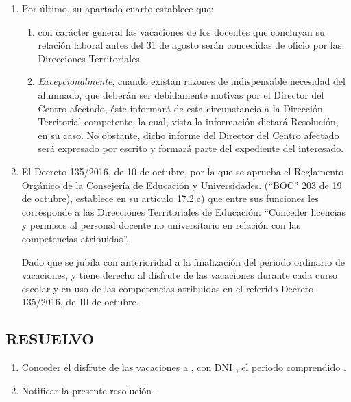 \begin{enumerate}
\begin{quotation}
\end{quotation}

\item Por último, su apartado cuarto establece que:

\begin{enumerate}

    \item con carácter general las vacaciones de los docentes que concluyan su 
    relación laboral antes del 31 de agosto serán concedidas de oficio por las 
    Direcciones Territoriales
    
    \item \emph{Excepcionalmente}, cuando existan razones de indispensable 
    necesidad del alumnado, que deberán ser debidamente motivas por el Director 
    del Centro afectado, éste informará de esta circunstancia a la Dirección 
    Territorial competente, la cual, vista la información dictará Resolución, 
    en su caso. No obstante, dicho informe del Director del Centro afectado será
    expresado por escrito y formará parte del expediente del interesado.
    
\end{enumerate}

\item El Decreto 135/2016, de 10 de octubre, por la que se aprueba el Reglamento
Orgánico de la Consejería de Educación y Universidades. (\enquote{BOC} 203 de 19
de octubre), establece en su artículo 17.2.c) que entre sus funciones les 
corresponde a las Direcciones Territoriales de Educación:  \enquote{Conceder 
licencias y permisos al personal docente no universitario en relación con las 
competencias atribuidas}.

Dado que   se jubila con anterioridad a la finalización
 del periodo ordinario de vacaciones, y tiene derecho al disfrute de las 
 vacaciones durante cada curso escolar y en uso de las  competencias atribuidas 
 en el referido Decreto 135/2016, de 10 de octubre,

\end{enumerate}

\subsection*{RESUELVO}

\begin{enumerate}

\item Conceder el disfrute de las vacaciones a  , con 
DNI , el periodo comprendido .

\item Notificar la presente resolución .

\end{enumerate}

\recurso